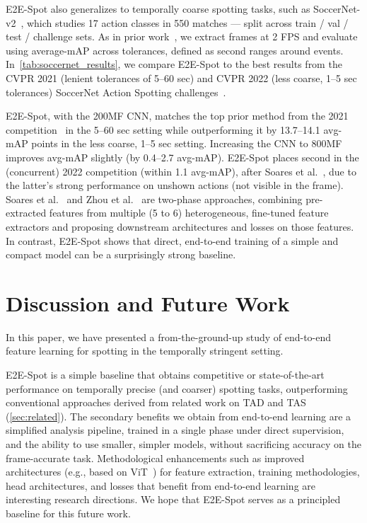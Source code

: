 \documentclass[runningheads]{llncs}
\newcommand{\OURMETHOD}{{E2E-Spot}\xspace}
\newcommand{\soccernet}{{SoccerNet-v2}\xspace}
\begin{document}
\OURMETHOD also generalizes to temporally coarse spotting tasks, such as \soccernet~\cite{soccernetv2}, which studies 17 action classes in 550 matches --- split across train / val / test / challenge sets.
As in prior work~\cite{calf,netvladpp,rmsnet}, we extract frames at 2 FPS and evaluate using average-mAP across tolerances, defined as  second ranges around events.
In~\autoref{tab:soccernet_results}, we compare \OURMETHOD to the best results from the CVPR 2021 (lenient tolerances of 5--60 sec) and CVPR 2022 (less coarse, 1--5 sec tolerances) SoccerNet Action Spotting challenges~\cite{snspotting}.

\OURMETHOD, with the 200MF CNN, matches the
top prior method from the 2021 competition~\cite{featurecombattention} in the 5--60 sec setting while outperforming it by 13.7--14.1 avg-mAP points in the less coarse, 1--5 sec setting.
Increasing the CNN to 800MF improves avg-mAP slightly (by 0.4--2.7 avg-mAP).
\OURMETHOD places second in the (concurrent) 2022 competition (within 1.1 avg-mAP), after Soares et al.~\cite{densedetectionanchorsrevisited}, due to the latter's strong performance on unshown actions (not visible in the frame).
Soares et al.~\cite{densedetectionanchors,densedetectionanchorsrevisited} and Zhou et al.~\cite{featurecombattention} are two-phase approaches, combining pre-extracted features from multiple (5 to 6) heterogeneous, fine-tuned feature extractors and proposing downstream architectures and losses on those features.
In contrast, \OURMETHOD shows that direct, end-to-end training of a simple and compact model can be a surprisingly strong baseline.
 
\section{Discussion and Future Work}
\label{sec:discussion}

In this paper, we have presented a from-the-ground-up study of end-to-end feature learning for spotting in the temporally stringent setting.

\OURMETHOD is a simple baseline that obtains competitive or state-of-the-art performance on temporally precise (and coarser) spotting tasks, outperforming conventional approaches derived from related work on TAD and TAS (\autoref{sec:related}).
The secondary benefits we obtain from end-to-end learning are a simplified analysis pipeline, trained in a single phase under direct supervision, and the ability to use smaller, simpler models, without sacrificing accuracy on the frame-accurate task.
Methodological enhancements such as improved architectures (e.g., based on ViT~\cite{vit}) for feature extraction, training methodologies, head architectures, and losses that benefit from end-to-end learning are interesting research directions.
We hope that \OURMETHOD serves as a principled baseline for this future work.
\end{document}

